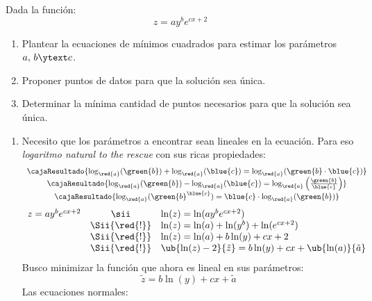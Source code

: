 \begin{enunciado}{\ejExtra}
  Dada la función:
  $$
    z = ay^b e^{cx + 2}
  $$
  \begin{enumerate}[label=\arabic*.]
    \item Plantear la ecuaciones de mínimos cuadrados para estimar los parámetros $a,\, b \ytext c$.
    \item Proponer puntos de datos para que la solución sea única.
    \item Determinar la mínima cantidad de puntos necesarios para que la solución sea única.
  \end{enumerate}
\end{enunciado}

\begin{enumerate}[label=\arabic*.]
  \item Necesito que los parámetros a encontrar sean lineales en la ecuación. Para eso \textit{ logaritmo natural to the rescue} con sus ricas propiedades:
        $$
          \begin{array}{c}
            \textstyle
            \cajaResultado{\log_{\red{a}}(\green{b})+\log_{\red{a}}(\blue{c})=\log_{\red{a}}(\green{b}\cdot \blue{c})}               \\
            \textstyle
            \cajaResultado{\log_{\red{a}}(\green{b})-\log_{\red{a}}(\blue{c})=\log_{\red{a}}\left(\frac{\green{b}}{\blue{c}}\right)} \\
            \cajaResultado{\log_{\red{a}}(\green{b}^{\blue{c}})=\blue{c}\cdot\log_{\red{a}}(\green{b})}
          \end{array}
        $$
        $$
          \begin{array}{rcl}
            z = ay^b e^{cx + 2}
             & \sii          &
            \ln(z) = \ln(ay^b e^{cx + 2})                 \\
             & \Sii{\red{!}} &
            \ln(z) = \ln(a) + \ln(y^b) +  \ln(e^{cx + 2}) \\
             & \Sii{\red{!}} &
            \ln(z) = \ln(a) + b\ln(y) +  cx + 2           \\
             & \Sii{\red{!}} &
            \ub{\ln(z) - 2}{\tilde{z}} = b \ln(y) + cx + \ub{\ln(a)}{\tilde{a}}
          \end{array}
        $$
        Busco minimizar la función que ahora es lineal en sus parámetros:
        $$
          \tilde{z} = b \ln(y) + cx + \tilde{a}
        $$
        Las ecuaciones normales:
        {
        \small
        $$
          \begin{array}{rcl}

\end{array}$$}
\end{enumerate}
